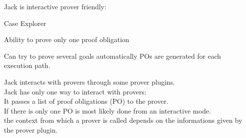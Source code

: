 Jack is interactive prover friendly:
\blist
\item Case Explorer
\item Ability to prove only {\purple one} proof obligation
\item Can try to prove several goals automatically
\elist
POs are generated for each {\purple execution path}.

 \small
Jack interacts with provers through some prover plugins.\\

Jack has only one way to interact with provers:\\
\rarrow It passes a {\purple list of proof obligations} (PO) to the prover.\\
If there is only one PO is most likely done from an interactive
mode.\\
\rarrow the context from which a prover is called depends on
the informations given by the {\purple prover plugin}.